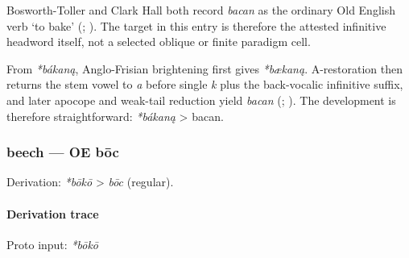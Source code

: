 \documentclass[
  british,
  a4paper,
]{article}
\begin{document}
Bosworth-Toller and Clark Hall both record \emph{bacan} as the ordinary
Old English verb `to bake' (; ).
The target in this entry is therefore the attested infinitive headword
itself, not a selected oblique or finite paradigm cell.

From \emph{*bákaną}, Anglo-Frisian brightening first gives
\emph{*bækaną}. A-restoration then returns the stem vowel to \emph{a}
before single \emph{k} plus the back-vocalic infinitive suffix, and
later apocope and weak-tail reduction yield \emph{bacan}
(;
). The development
is therefore straightforward: \emph{*bákaną} \textgreater{} bacan.

\subsubsection{beech --- OE bōc}\label{beech-oe-bux14dc-1}

Derivation: \emph{*bōkō} \textgreater{} \emph{bōc} (regular).

\paragraph{Derivation trace}\label{derivation-trace-13}

Proto input: \emph{*bōkō}

\begingroup
\setlength{\fboxsep}{6pt}
\end{document}

